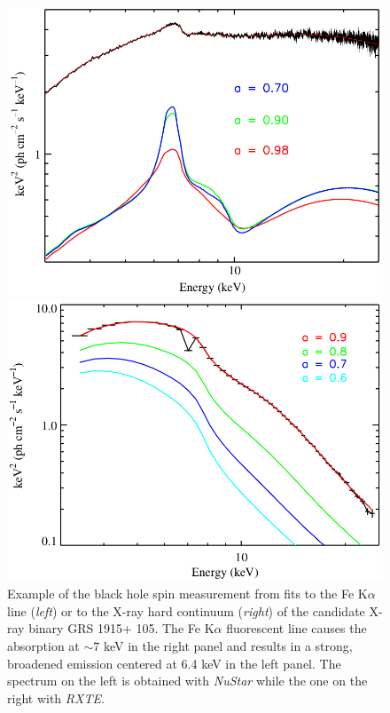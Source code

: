 \documentclass[a4paper,titlepage]{book}     	%
\begin{document}
\begin{figure}
	\begin{minipage}{.48\textwidth}
		\centering
		\includegraphics[width=\textwidth]{./images/spinreflection.png}
	\end{minipage}
	\hfill
	\begin{minipage}{.49\textwidth}
		\centering
		\includegraphics[width=\textwidth]{./images/spincontinuum.png}	
	\end{minipage}
	\caption{Example of the black hole spin measurement from fits to the Fe K$\alpha$ line (\emph{left}) or to the X-ray hard continuum (\emph{right}) of the candidate X-ray binary GRS 1915+ 105. The Fe K$\alpha$ fluorescent line causes the absorption at $\sim 7$ keV in the right panel and results in a strong, broadened emission centered at 6.4 keV in the left panel. The spectrum on the left is obtained with \textit{NuStar} while the one on the right with \textit{RXTE}. \cite{GSR1915_lowhardXstate}}\label{fig:spinmeasure}
\end{figure}
\end{document}
